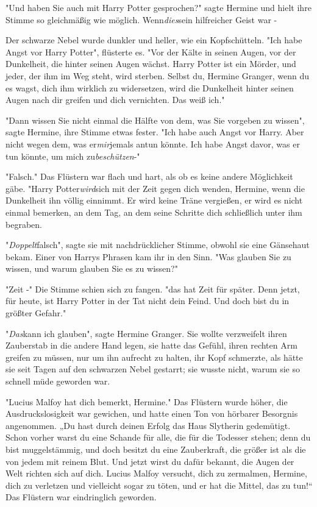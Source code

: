 {"Und haben Sie auch mit Harry Potter gesprochen?" sagte Hermine und hielt ihre Stimme so gleichmäßig wie möglich. Wenn\emph{dies}sein hilfreicher Geist war -

Der schwarze Nebel wurde dunkler und heller, wie ein Kopfschütteln. "Ich habe Angst vor Harry Potter", flüsterte es. "Vor der Kälte in seinen Augen, vor der Dunkelheit, die hinter seinen Augen wächst. Harry Potter ist ein Mörder, und jeder, der ihm im Weg steht, wird sterben. Selbst du, Hermine Granger, wenn du es wagst, dich ihm wirklich zu widersetzen, wird die Dunkelheit hinter seinen Augen nach dir greifen und dich vernichten. Das weiß ich."

"Dann wissen Sie nicht einmal die Hälfte von dem, was Sie vorgeben zu wissen", sagte Hermine, ihre Stimme etwas fester. "Ich habe auch Angst vor Harry. Aber nicht wegen dem, was er\emph{mir}jemals antun könnte. Ich habe Angst davor, was er tun könnte, um mich zu\emph{beschützen}-"

"Falsch." Das Flüstern war flach und hart, als ob es keine andere Möglichkeit gäbe. "Harry Potter\emph{wird}sich mit der Zeit gegen dich wenden, Hermine, wenn die Dunkelheit ihn völlig einnimmt. Er wird keine Träne vergießen, er wird es nicht einmal bemerken, an dem Tag, an dem seine Schritte dich schließlich unter ihm begraben.

"\emph{Doppelt}falsch", sagte sie mit nachdrücklicher Stimme, obwohl sie eine Gänsehaut bekam. Einer von Harrys Phrasen kam ihr in den Sinn. "Was glauben Sie zu wissen, und warum glauben Sie es zu wissen?"

"Zeit -" Die Stimme schien sich zu fangen. "das hat Zeit für später. Denn jetzt, für heute, ist Harry Potter in der Tat nicht dein Feind. Und doch bist du in größter Gefahr."

"\emph{Das}kann ich glauben", sagte Hermine Granger. Sie wollte verzweifelt ihren Zauberstab in die andere Hand legen, sie hatte das Gefühl, ihren rechten Arm greifen zu müssen, nur um ihn aufrecht zu halten, ihr Kopf schmerzte, als hätte sie seit Tagen auf den schwarzen Nebel gestarrt; sie wusste nicht, warum sie so schnell müde geworden war.

"Lucius Malfoy hat dich bemerkt, Hermine." Das Flüstern wurde höher, die Ausdruckslosigkeit war gewichen, und hatte einen Ton von hörbarer Besorgnis angenommen. „Du hast durch deinen Erfolg das Haus Slytherin gedemütigt. Schon vorher warst du eine Schande für alle, die für die Todesser stehen; denn du bist muggelstämmig, und doch besitzt du eine Zauberkraft, die größer ist als die von jedem mit reinem Blut. Und jetzt wirst du dafür bekannt, die Augen der Welt richten sich auf dich. Lucius Malfoy versucht, dich zu zermalmen, Hermine, dich zu verletzen und vielleicht sogar zu töten, und er hat die Mittel, das zu tun!“ Das Flüstern war eindringlich geworden.

}
